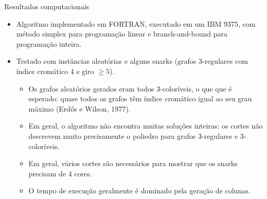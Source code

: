 \documentclass{beamer}
\begin{document}
    \begin{frame}{Resultados computacionais}

        \begin{itemize}
            \item Algoritmo implementado em FORTRAN, executado em um IBM 9375, com método simplex para programação linear e branch-and-bound para programação inteira.
            
            \item Testado com instâncias aleatórias e alguns snarks (grafos 3-regulares com índice cromático 4 e giro $\geq 5$).
            
            \begin{itemize}
                \item Os grafos aleatórios gerados eram todos 3-coloríveis, o que que é esperado: quase todos os grafos têm índice cromático igual ao seu grau máximo {\color{blue} (Erdős e Wilson, 1977)}.
                \item Em geral, o algoritmo não encontra muitas soluções inteiras: os cortes não descrevem muito precisamente o poliedro para grafos 3-regulares e 3-coloríveis.
                \item Em geral, vários cortes são necessários para mostrar que os snarks precisam de 4 cores.
                \item O tempo de execução geralmente é dominado pela geração de colunas.
            \end{itemize}
        \end{itemize}
    \end{frame}
\end{document}
